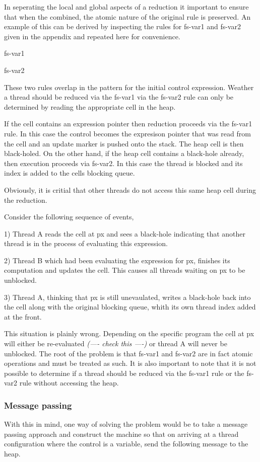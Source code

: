 \documentclass{llncs}
\begin{document}
In seperating the local and global aspects of a reduction it important to ensure that when the combined, the atomic nature of the original rule is preserved. An example of this can be derived by inspecting the rules for fs-var1 and fs-var2 given in the appendix and repeated here for convenience. 

fs-var1

fs-var2

These two rules overlap in the pattern for the initial control expression. Weather a thread should be reduced via the fs-var1 via the fs-var2 rule can only be determined by reading the appropriate cell in the heap. 

If the cell contains an expression pointer then reduction proceeds via the fs-var1 rule. In this case the control becomes the expresison pointer that was read from the cell and an update marker is pushed onto the stack. The heap cell is then black-holed. On the other hand, if the heap cell contains a black-hole already, then execution proceeds via fs-var2. In this case the thread is blocked and its index is added to the cells blocking queue.

Obviously, it is critial that other threads do not access this same heap cell during the reduction.

Consider the following sequence of events, 

1) Thread A reads the cell at px and sees a black-hole indicating that another thread is in the process of evaluating this expression.

2) Thread B which had been evaluating the expression for px, finishes its computation and updates the cell. This causes all threads waiting on px to be unblocked.

3) Thread A, thinking that px is still unevaulated, writes a black-hole back into the cell along with the original blocking queue, whith its own thread index added at the front.

This situation is plainly wrong. Depending on the specific program the cell at px will either be re-evaluated \emph{(---- check this ----)} or thread A will never be unblocked. The root of the problem is that fs-var1 and fs-var2 are in fact atomic operations and must be treated as such. It is also important to note that it is not possible to determine if a thread should be reduced via the fs-var1 rule or the fs-var2 rule without accessing the heap.

\subsubsection{Message passing}
With this in mind, one way of solving the problem would be to take a message passing approach and construct the machine so that on arriving at a thread configuration where the control is a variable, send the following message to the heap.
\end{document}
